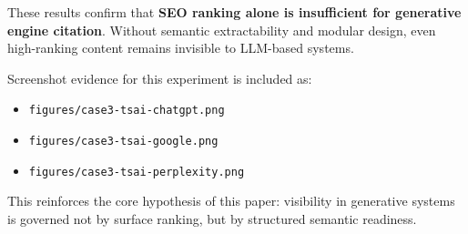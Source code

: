 These results confirm that \textbf{SEO ranking alone is insufficient for generative engine citation}. Without semantic extractability and modular design, even high-ranking content remains invisible to LLM-based systems.

Screenshot evidence for this experiment is included as:

\begin{itemize}
  \item \texttt{figures/case3-tsai-chatgpt.png}
  \item \texttt{figures/case3-tsai-google.png}
  \item \texttt{figures/case3-tsai-perplexity.png}
\end{itemize}

This reinforces the core hypothesis of this paper: visibility in generative systems is governed not by surface ranking, but by structured semantic readiness.
